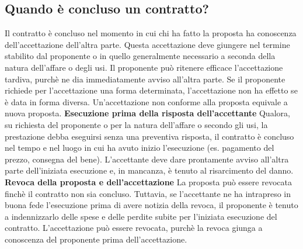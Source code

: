 \subsection{Quando è concluso un contratto?}
Il contratto è concluso nel momento in cui chi ha fatto la proposta ha conoscenza
dell'accettazione dell'altra parte. Questa accettazione deve giungere nel termine stabilito dal
proponente o in quello generalmente necessario a seconda della natura dell'affare o degli usi.\newline
Il proponente può ritenere efficace l'accettazione tardiva, purchè ne dia immediatamente avviso all'altra
parte. Se il  proponente richiede per l'accettazione una forma determinata, l'accettazione non ha
effetto se è data in forma diversa. Un'accettazione non conforme alla proposta equivale a nuova proposta. \newline
\textbf{Esecuzione prima della risposta dell'accettante}\newline
Qualora, su richiesta del proponente o per la natura dell'affare o secondo gli usi, la prestazione debba
eseguirsi senza una preventiva risposta, il contratto è concluso nel tempo e nel luogo in cui ha avuto
inizio l'esecuzione (es. pagamento del prezzo, consegna del bene). L'accettante deve dare prontamente avviso
all'altra parte dell'iniziata esecuzione e, in mancanza, è tenuto al risarcimento del danno. \newline
\textbf{Revoca della proposta e dell'accettazione}\newline
La proposta può essere revocata finchè il contratto non sia concluso. Tuttavia, se l'accettante
ne ha intrapreso in buona fede l'esecuzione prima di avere notizia della revoca, il proponente è tenuto a
indennizzarlo delle spese e delle perdite subite per l'iniziata esecuzione del contratto.\newline
L'accettazione può essere revocata, purchè la revoca giunga a conoscenza del proponente prima dell'accettazione.

